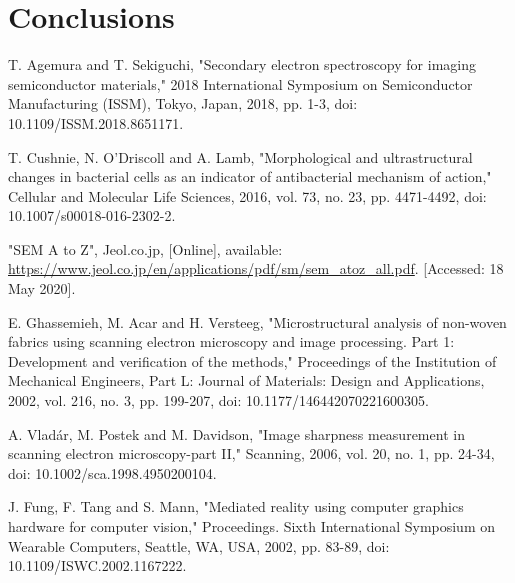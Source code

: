 \documentclass[12pt, conference]{IEEEtran}
\begin{document}
\section{Conclusions}

\begin{thebibliography}{00}
    T. Agemura and T. Sekiguchi, "Secondary electron spectroscopy for imaging semiconductor materials," 2018 International Symposium on Semiconductor Manufacturing (ISSM), Tokyo, Japan, 2018, pp. 1-3, doi: 10.1109/ISSM.2018.8651171.

    T. Cushnie, N. O’Driscoll and A. Lamb, "Morphological and ultrastructural changes in bacterial cells as an indicator of antibacterial mechanism of action," Cellular and Molecular Life Sciences, 2016, vol. 73, no. 23, pp. 4471-4492, doi: 10.1007/s00018-016-2302-2.

    "SEM A to Z", Jeol.co.jp, [Online], available: \url{https://www.jeol.co.jp/en/applications/pdf/sm/sem_atoz_all.pdf}. [Accessed: 18 May 2020].

    E. Ghassemieh, M. Acar and H. Versteeg, "Microstructural analysis of non-woven fabrics using scanning electron microscopy and image processing. Part 1: Development and verification of the methods," Proceedings of the Institution of Mechanical Engineers, Part L: Journal of Materials: Design and Applications, 2002, vol. 216, no. 3, pp. 199-207, doi: 10.1177/146442070221600305.

    A. Vladár, M. Postek and M. Davidson, "Image sharpness measurement in scanning electron microscopy-part II," Scanning, 2006, vol. 20, no. 1, pp. 24-34, doi: 10.1002/sca.1998.4950200104.

    J. Fung, F. Tang and S. Mann, "Mediated reality using computer graphics hardware for computer vision," Proceedings. Sixth International Symposium on Wearable Computers, Seattle, WA, USA, 2002, pp. 83-89, doi: 10.1109/ISWC.2002.1167222.




\end{thebibliography}
\end{document}
